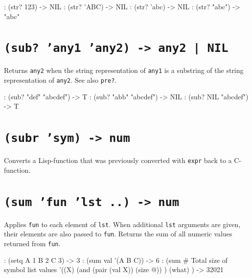 \begin{wideverbatim}
: (str? 123)
-> NIL
: (str? '{ABC})
-> NIL
: (str? 'abc)
-> NIL
: (str? "abc")
-> "abc"
\end{wideverbatim}

 
\section*{\texttt{(sub? 'any1 'any2) -> any2 | NIL}}
\label{sec:func-ref-S-(sub? 'any1 'any2) -> any2 | NIL}


Returns \texttt{any2} when the string representation of \texttt{any1} is a substring
of the string representation of \texttt{any2}. See also \texttt{pre?}.


\begin{wideverbatim}
: (sub? "def" "abcdef")
-> T
: (sub? "abb" "abcdef")
-> NIL
: (sub? NIL "abcdef")
-> T
\end{wideverbatim}

 
\section*{\texttt{(subr 'sym) -> num}}
\label{sec:func-ref-S-(subr 'sym) -> num}


Converts a Lisp-function that was previously converted with \texttt{expr} back
to a C-function.



 
\section*{\texttt{(sum 'fun 'lst ..) -> num}}
\label{sec:func-ref-S-(sum 'fun 'lst ..) -> num}


Applies \texttt{fun} to each element of \texttt{lst}. When additional \texttt{lst} arguments
are given, their elements are also passed to \texttt{fun}. Returns the sum of
all numeric values returned from \texttt{fun}.


\begin{wideverbatim}
: (setq A 1  B 2  C 3)
-> 3
: (sum val '(A B C))
-> 6
: (sum                           # Total size of symbol list values
   '((X)
      (and (pair (val X)) (size @)) )
   (what) )
-> 32021
\end{wideverbatim}

